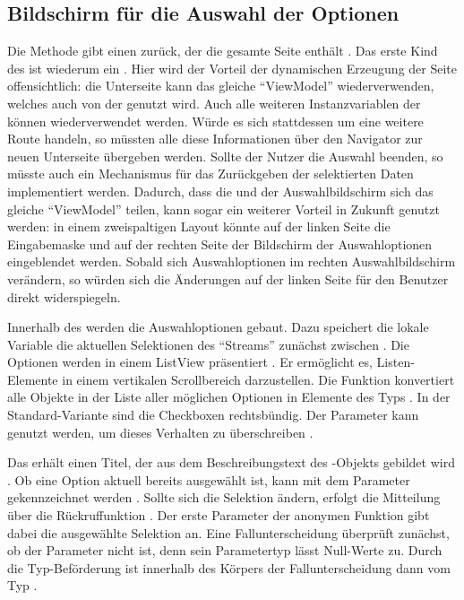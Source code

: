 \subsection{Bildschirm für die Auswahl der Optionen}

 
Die Methode  \Lst{\ref{lst:Schritt1FunktionCreateMultipleChoiceSelectionScreen}} gibt einen  zurück, der die gesamte Seite enthält .
Das erste Kind des  ist wiederum ein  .
Hier wird der Vorteil der dynamischen Erzeugung der Seite offensichtlich: die Unterseite kann das gleiche \enquote{ViewModel} wiederverwenden, welches auch von der  genutzt wird.  Auch alle weiteren Instanzvariablen der  können wiederverwendet werden. Würde es sich stattdessen um eine weitere Route handeln, so müssten alle diese Informationen über den Navigator zur neuen Unterseite übergeben werden. Sollte der Nutzer die Auswahl beenden, so müsste auch ein Mechanismus für das Zurückgeben der selektierten Daten implementiert werden.
Dadurch, dass die  und der Auswahlbildschirm sich das gleiche \enquote{ViewModel} teilen, kann sogar ein weiterer Vorteil in Zukunft genutzt werden: in einem zweispaltigen Layout könnte auf der linken Seite die Eingabemaske und auf der rechten Seite der Bildschirm der Auswahloptionen eingeblendet werden.
Sobald sich Auswahloptionen im rechten Auswahlbildschirm verändern, so würden sich die Änderungen auf der linken Seite für den Benutzer direkt widerspiegeln.

Innerhalb des  werden die Auswahloptionen gebaut.
Dazu speichert die lokale Variable  die aktuellen Selektionen des \enquote{Streams} zunächst zwischen .
Die Optionen werden in einem ListView präsentiert .
Er ermöglicht es, Listen-Elemente in einem vertikalen Scrollbereich darzustellen.
Die Funktion  konvertiert alle Objekte in der Liste aller möglichen Optionen  in Elemente des Typs  .
In der Standard-Variante sind die Checkboxen rechtsbündig.
Der Parameter  kann genutzt werden, um dieses Verhalten zu überschreiben .

Das  erhält einen Titel, der aus dem Beschreibungstext  des -Objekts gebildet wird .
Ob eine Option aktuell bereits ausgewählt ist, kann mit dem Parameter  gekennzeichnet werden .
Sollte sich die Selektion ändern, erfolgt die Mitteilung über die Rückruffunktion  .
Der erste Parameter der anonymen Funktion gibt dabei die ausgewählte Selektion an.
Eine Fallunterscheidung überprüft zunächst, ob der Parameter  nicht  ist, denn sein Parametertyp  lässt Null-Werte zu.
Durch die Typ-Beförderung ist  innerhalb des Körpers der Fallunterscheidung dann vom Typ  . 


